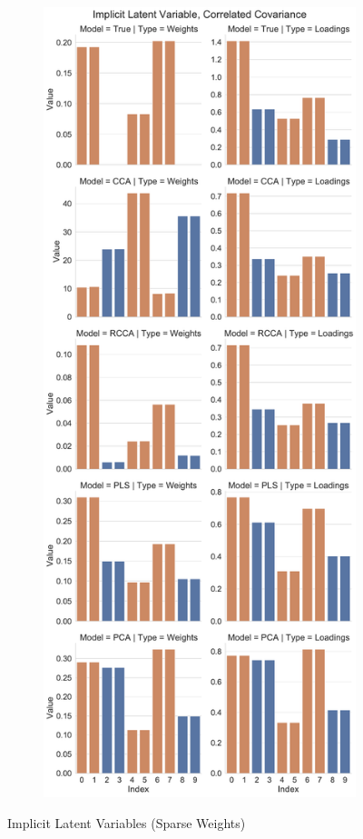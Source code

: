 \begin{figure}
\begin{subfigure}{0.49\linewidth}
\end{subfigure}
%
\begin{subfigure}{0.49\linewidth}
\centering
\includegraphics[width=\linewidth]{figures/simulated/Combined_Weights_Loadings_with_Error_Bars_Correlated_Covariance_implicit.pdf}
\end{subfigure}
    \caption{Implicit Latent Variables (Sparse Weights)}\label{fig:implicit-sparse-weights}
\end{figure}

